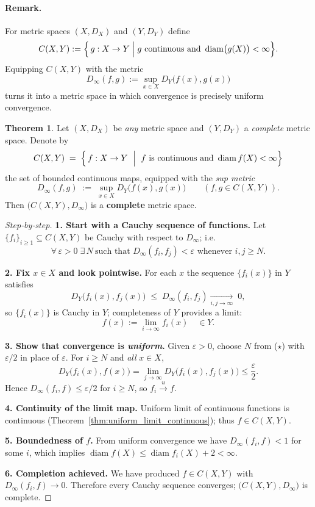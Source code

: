 \documentclass[12pt]{article}
\DeclareMathOperator{\diam}{diam}
\theoremstyle{definition} %
\newtheorem{theorem}{Theorem}
\theoremstyle{plain} %
\begin{document}
\paragraph{Remark.}
For metric spaces $(X,D_X)$ and $(Y,D_Y)$ define
\[
  C(X,Y):=\Bigl\{\,g:X\to Y\;\Big|\; g\ \text{continuous and }
  \diam\bigl(g(X)\bigr)<\infty\Bigr\}.
\]
Equipping $C(X,Y)$ with the metric
\[
  D_{\!\infty}(f,g):=\sup_{x\in X}D_Y\!\bigl(f(x),g(x)\bigr)
\]
turns it into a metric space in which convergence is precisely uniform
convergence.
\begin{theorem}\label{thm:CXY_complete}
  Let $(X,D_X)$ be \emph{any} metric space and $(Y,D_Y)$ a
  \emph{complete} metric space.
  Denote by
  \[
      C(X,Y)\;=\;\Bigl\{\,f:X\to Y \ \Bigm|\ 
          f \text{ is continuous and }
          \operatorname{diam}f(X)<\infty\Bigr\}
  \]
  the set of bounded continuous maps,
  equipped with the \emph{sup metric}
  \[
      D_\infty(f,g)\;:=\;\sup_{x\in X}D_Y\!\bigl(f(x),g(x)\bigr)
      \qquad (f,g\in C(X,Y)).
  \]
  Then $\bigl(C(X,Y),D_\infty\bigr)$ is a \textbf{complete} metric space.
\end{theorem}

\begin{proof}[Step‑by‑step]
  \textbf{1.  Start with a Cauchy sequence of functions.}  
  Let $\{f_i\}_{i\ge1}\subseteq C(X,Y)$ be Cauchy with respect to
  $D_\infty$; i.e.\
  \[
      \forall\,\varepsilon>0\;\exists\,N\
      \text{such that }D_\infty(f_i,f_j)<\varepsilon
      \text{ whenever }i,j\ge N. \tag{$\star$}
  \]

  \textbf{2.  Fix $x\in X$ and look pointwise.}  
  For each $x$ the sequence $\{f_i(x)\}$ in $Y$ satisfies
  \[
      D_Y\!\bigl(f_i(x),f_j(x)\bigr)\;\le\;D_\infty(f_i,f_j)
      \xrightarrow[i,j\to\infty]{}\;0,
  \]
  so $\{f_i(x)\}$ is Cauchy in $Y$; completeness of $Y$ provides a limit:
  \[
      f(x):=\lim_{i\to\infty}f_i(x)\quad\in Y. \tag{$\dagger$}
  \]

  \textbf{3.  Show that convergence is \emph{uniform}.}  
  Given $\varepsilon>0$, choose $N$ from ($\star$) with $\varepsilon/2$
  in place of $\varepsilon$.  For $i\ge N$ and \emph{all} $x\in X$,
  \[
      D_Y\!\bigl(f_i(x),f(x)\bigr)
          =\lim_{j\to\infty}D_Y\!\bigl(f_i(x),f_j(x)\bigr)
          \le\frac{\varepsilon}{2}.
  \]
  Hence $D_\infty(f_i,f)\le\varepsilon/2$ for $i\ge N$, so
  $f_i\xrightarrow{\;u\;}f$.

  \textbf{4.  Continuity of the limit map.}  
  Uniform limit of continuous functions is continuous
  (Theorem \ref{thm:uniform_limit_continuous}); thus $f\in C(X,Y)$.

  \textbf{5.  Boundedness of $f$.}  
  From uniform convergence we have
  \(
      D_\infty(f_i,f)<1
  \)
  for some $i$, which implies
  \(
      \operatorname{diam}f(X)\le
      \operatorname{diam}f_i(X)+2<\infty.
  \)

  \textbf{6.  Completion achieved.}  
  We have produced $f\in C(X,Y)$ with $D_\infty(f_i,f)\to0$.
  Therefore every Cauchy sequence converges; $\bigl(C(X,Y),D_\infty\bigr)$
  is complete.
\end{proof}
\end{document}
